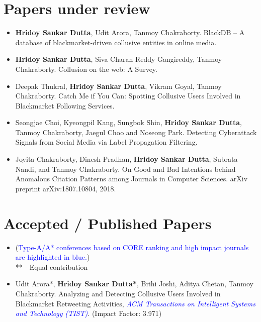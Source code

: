 \documentclass[margin, centered]{res}
\begin{document}
\begin{resume}
\section{Papers under review}
\begin{itemize}[leftmargin=*]


\item \textbf{Hridoy Sankar Dutta}, Udit Arora, Tanmoy Chakraborty. BlackDB -- A database of blackmarket-driven collusive entities in online media.



\item \textbf{Hridoy Sankar Dutta}, Siva Charan Reddy Gangireddy, Tanmoy Chakraborty. Collusion on the web: A Survey.



\item Deepak Thukral, \textbf{Hridoy Sankar Dutta}, Vikram Goyal, Tanmoy Chakraborty. Catch Me if You Can: Spotting Collusive Users Involved in Blackmarket Following Services.

\item Seongjae Choi, Kyeongpil Kang, Sungbok Shin, \textbf{Hridoy Sankar Dutta}, Tanmoy Chakraborty, Jaegul Choo and Noseong Park. Detecting Cyberattack Signals from Social Media via Label Propagation Filtering.


\item Joyita Chakraborty, Dinesh Pradhan, \textbf{Hridoy Sankar Dutta}, Subrata Nandi, and Tanmoy Chakraborty. On Good and Bad Intentions behind Anomalous Citation Patterns among Journals in Computer Sciences. arXiv preprint arXiv:1807.10804, 2018.
\end{itemize}

\section{Accepted / Published Papers}
\begin{itemize}[leftmargin=*]
\item[] (\textcolor{blue}{Type-A/A* conferences based on CORE ranking and high impact journals are highlighted in blue.}) \\ ** - Equal contribution

\item Udit Arora*, \textbf{Hridoy Sankar Dutta*}, Brihi Joshi, Aditya Chetan, Tanmoy Chakraborty. Analyzing and Detecting Collusive Users Involved in Blackmarket Retweeting Activities,  \textit{\textcolor{blue}{ACM Transactions on Intelligent Systems and Technology (TIST)}}. (Impact Factor: 3.971)


\end{itemize}
\end{resume}
\end{document}
